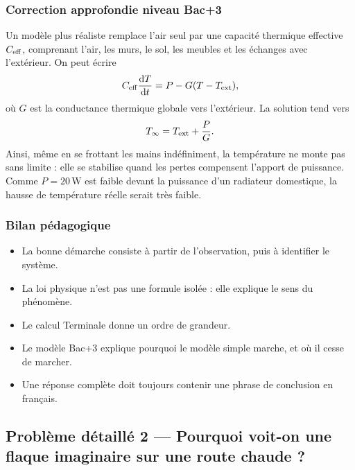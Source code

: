 \documentclass[11pt,a4paper]{article}
\begin{document}
\subsubsection*{Correction approfondie niveau Bac+3}

\begin{approfondissementbox}

Un modèle plus réaliste remplace l'air seul par une capacité thermique effective \(C_{\rm eff}\), comprenant l'air, les murs, le sol, les meubles et les échanges avec l'extérieur. On peut écrire
\[
C_{\rm eff}\frac{\mathrm dT}{\mathrm dt}=P-G(T-T_{\rm ext}),
\]
où \(G\) est la conductance thermique globale vers l'extérieur. La solution tend vers
\[
T_\infty=T_{\rm ext}+\frac{P}{G}.
\]
Ainsi, même en se frottant les mains indéfiniment, la température ne monte pas sans limite : elle se stabilise quand les pertes compensent l'apport de puissance. Comme \(P=20\,\mathrm W\) est faible devant la puissance d'un radiateur domestique, la hausse de température réelle serait très faible.

\end{approfondissementbox}

\subsubsection*{Bilan pédagogique}

\begin{methodebox}
\begin{itemize}
  \item La bonne démarche consiste à partir de l'observation, puis à identifier le système.
  \item La loi physique n'est pas une formule isolée : elle explique le sens du phénomène.
  \item Le calcul Terminale donne un ordre de grandeur.
  \item Le modèle Bac+3 explique pourquoi le modèle simple marche, et où il cesse de marcher.
  \item Une réponse complète doit toujours contenir une phrase de conclusion en français.
\end{itemize}
\end{methodebox}

\subsection{Problème détaillé 2 — Pourquoi voit-on une flaque imaginaire sur une route chaude ?}
\end{document}
